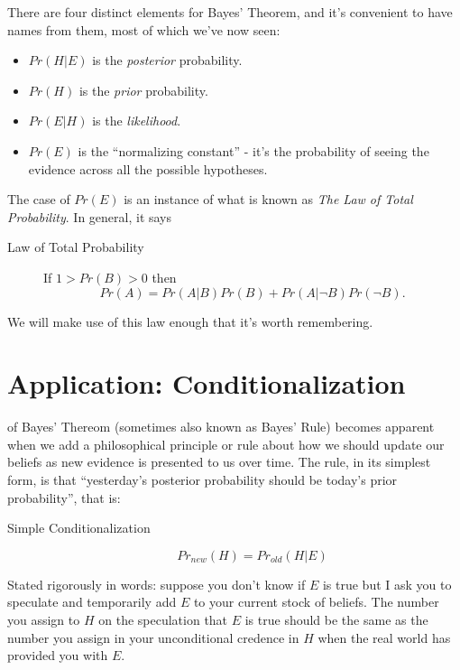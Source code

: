 \documentclass[]{tufte-book}
\providecommand{\tightlist}{%
  \setlength{\itemsep}{0pt}\setlength{\parskip}{0pt}}
\begin{document}
There are four distinct elements for Bayes' Theorem, and it's convenient to have names from them, most of which we've now seen:

\begin{itemize}
\tightlist
\item
  \(Pr(H|E)\) is the \emph{posterior} probability.
\item
  \(Pr(H)\) is the \emph{prior} probability.
\item
  \(Pr(E|H)\) is the \emph{likelihood}.
\item
  \(Pr(E)\) is the ``normalizing constant'' - it's the probability of seeing the evidence across all the possible hypotheses.
\end{itemize}

The case of \(Pr(E)\) is an instance of what is known as \emph{The Law of Total Probability}. In general, it says

\begin{description}
\item[Law of Total Probability]
If \(1 > Pr(B) > 0\) then \[Pr(A) = Pr(A | B)Pr(B) + Pr(A | \neg B)Pr(\neg B).\]
\end{description}

We will make use of this law enough that it's worth remembering.

\hypertarget{application-conditionalization}{%
\section{Application: Conditionalization}\label{application-conditionalization}}

 of Bayes' Thereom (sometimes also known as Bayes' Rule) becomes apparent when we add a philosophical principle or rule about how we should update our beliefs as new evidence is presented to us over time. The rule, in its simplest form, is that ``yesterday's posterior probability should be today's prior probability'', that is:

\begin{description}
\item[Simple Conditionalization]
\[Pr_{new}(H) = Pr_{old}(H|E)\]
\end{description}

Stated rigorously in words: suppose you don't know if \(E\) is true but I ask you to speculate and temporarily add \(E\) to your current stock of beliefs. The number you assign to \(H\) on the speculation that \(E\) is true should be the same as the number you assign in your unconditional credence in \(H\) when the real world has provided you with \(E\).
\end{document}
